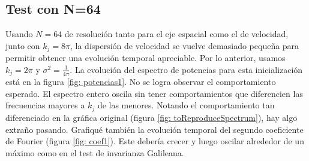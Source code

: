 \documentclass[notitlepage,letterpaper,12pt]{article} %
\begin{document}
\subsection{Test con N=64}
Usando $N=64$ de resolución tanto para el eje espacial como el de velocidad, junto con $k_j = 8\pi$, la dispersión de velocidad se vuelve demasiado pequeña para permitir obtener una evolución temporal apreciable. Por lo anterior, usamos $k_j = 2\pi$ y $\sigma^2 = \frac{1}{4\pi}$.
La evolución del espectro de potencias para esta inicialización está en la figura \ref{fig: potencias1}.
No se logra observar el comportamiento esperado. El espectro entero oscila sin tener comportamientos que diferencien las frecuencias mayores a $k_j$ de las menores.
Notando el comportamiento tan diferenciado en la gráfica original (figura \ref{fig: toReproduceSpectrum}), hay algo extraño pasando. 
Grafiqué también la evolución temporal del segundo coeficiente de Fourier (figura \ref{fig: coef1}).
Este debería crecer y luego oscilar alrededor de un máximo como en el test de invarianza Galileana. 
\end{document}
